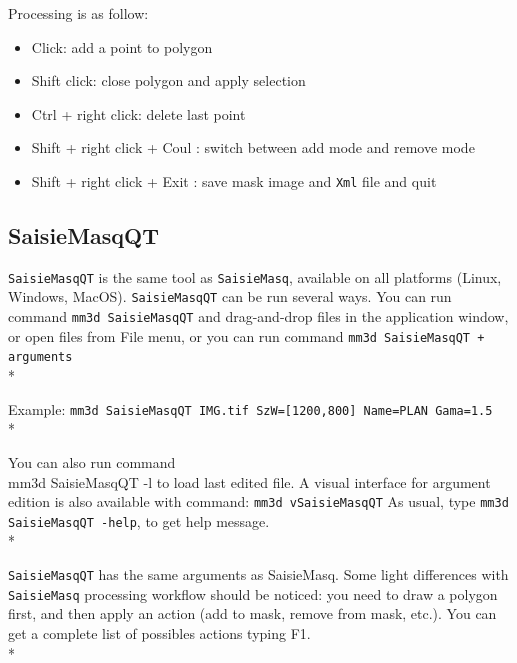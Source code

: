 Processing is as follow:
\begin{itemize}
\item Click: add a point to polygon
\item Shift click: close polygon and apply selection
\item Ctrl + right click: delete last point
\item Shift + right click + Coul : switch between add mode and remove mode
\item Shift + right click + Exit : save mask image and {\tt Xml} file and quit
\end{itemize}

\subsection{SaisieMasqQT}

\label{Doc:SaisieMasqQT}
{\tt SaisieMasqQT} is the same tool as {\tt SaisieMasq}, available on all platforms (Linux, Windows, MacOS).
{\tt SaisieMasqQT} can be run several ways. You can run command {\tt mm3d SaisieMasqQT} and drag-and-drop files in the application window, or open files from File menu, or you can run command {\tt mm3d SaisieMasqQT + arguments}\\*

Example: {\tt mm3d SaisieMasqQT IMG.tif SzW=[1200,800] Name=PLAN Gama=1.5}\\*

You can also run command {\\ mm3d SaisieMasqQT -l} to load last edited file.
A visual interface for argument edition is also available with command: {\tt mm3d vSaisieMasqQT}
As usual, type {\tt mm3d SaisieMasqQT -help}, to get help message.\\*

{\tt SaisieMasqQT} has the same arguments as SaisieMasq. Some light differences with {\tt SaisieMasq} processing workflow should be noticed:
you need to draw a polygon first, and then apply an action (add to mask, remove from mask, etc.).
You can get a complete list of possibles actions typing F1.\\*

